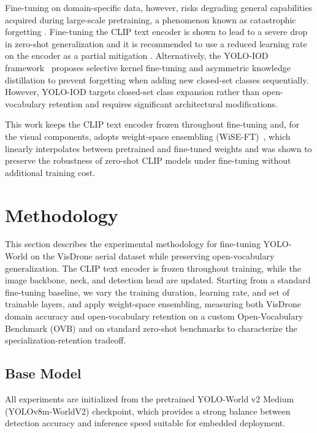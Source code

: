 \documentclass[conf]{new-aiaa}
\begin{document}
Fine-tuning on domain-specific data, however, risks degrading general capabilities acquired during large-scale pretraining, a phenomenon known as catastrophic forgetting \cite{mccloskey1989catastrophic}. Fine-tuning the CLIP text encoder is shown to lead to a severe drop in zero-shot generalization and it is recommended to use a reduced learning rate on the encoder as a partial mitigation \cite{cheng2024yoloworld}. Alternatively, the YOLO-IOD framework~\cite{zhang2026yoloiodrealtimeincremental} proposes 
selective kernel fine-tuning and asymmetric knowledge distillation to prevent forgetting when adding new closed-set classes sequentially. However, YOLO-IOD targets closed-set class expansion rather than open-vocabulary retention and requires significant architectural modifications.

This work keeps the {CLIP} text encoder frozen throughout fine-tuning and, for the visual
components, adopts weight-space ensembling (WiSE-FT)~\cite{wortsman2022robust}, which
linearly interpolates between pretrained and fine-tuned weights and was shown to preserve the
robustness of zero-shot CLIP models under fine-tuning without additional training cost.


\section{Methodology}

This section describes the experimental methodology for fine-tuning YOLO-World on the
VisDrone aerial dataset while preserving open-vocabulary generalization. The {CLIP} text
encoder is frozen throughout training, while the image backbone, neck, and detection head are
updated. Starting from a standard fine-tuning baseline, we vary the training duration, learning
rate, and set of trainable layers, and apply weight-space ensembling, measuring both VisDrone
domain accuracy and open-vocabulary retention on a custom Open-Vocabulary Benchmark (OVB) and
on standard zero-shot benchmarks to characterize the specialization-retention tradeoff.

\subsection{Base Model}

All experiments are initialized from the pretrained YOLO-World v2 Medium (YOLOv8m-WorldV2) checkpoint, which provides a strong balance between detection accuracy and inference speed suitable for embedded deployment.
\end{document}
